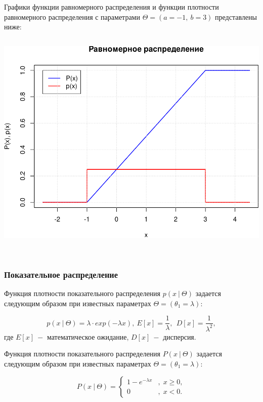 \documentclass[
  14,
]{article}
\begin{document}
Графики функции равномерного распределения и функции плотности
равномерного распределения с параметрами \(\Theta=(a=-1,\ b = 3)\)
представлены ниже:

\[
\ 
\]

\begin{center}\includegraphics[width=0.75\linewidth]{Prac3_files/figure-latex/unnamed-chunk-3-1} \end{center}

\(\ \)

\hypertarget{ux43fux43eux43aux430ux437ux430ux442ux435ux43bux44cux43dux43eux435-ux440ux430ux441ux43fux440ux435ux434ux435ux43bux435ux43dux438ux435}{%
\subsubsection{\texorpdfstring{\textbf{Показательное
распределение}}{Показательное распределение}}\label{ux43fux43eux43aux430ux437ux430ux442ux435ux43bux44cux43dux43eux435-ux440ux430ux441ux43fux440ux435ux434ux435ux43bux435ux43dux438ux435}}

Функция плотности показательного распределения \(p(x\ | \ \Theta)\)
задается следующим образом при известных параметрах
\(\Theta = (\theta_1 = \lambda)\):

\[
p(x\ | \ \Theta) = \lambda \cdot exp(-\lambda x),\  E[x] = \frac{1}{\lambda},\ \ D[x] = \frac{1}{\lambda^2},
\] где \(E[x]\ -\) математическое ожидание, \(D[x]\ -\) дисперсия.

Функция плотности показательного распределения \(P(x\ | \ \Theta)\)
задается следующим образом при известных параметрах
\(\Theta = (\theta_1 = \lambda)\):

\[
P(x \ | \ \Theta)=\left\{{\begin{matrix}1-e^{{-\lambda x}}&,\;x\geq 0,\\0&,\;x<0.\end{matrix}}\right.
\]
\end{document}
